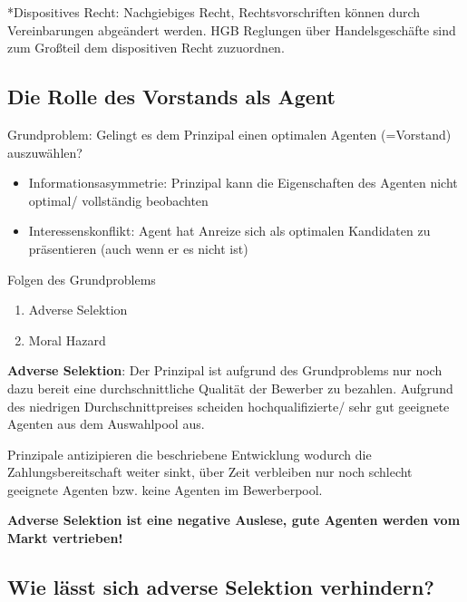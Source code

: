 \documentclass[
]{article}
\providecommand{\tightlist}{%
  \setlength{\itemsep}{0pt}\setlength{\parskip}{0pt}}
\begin{document}
*Dispositives Recht: Nachgiebiges Recht, Rechtsvorschriften können durch
Vereinbarungen abgeändert werden. HGB Reglungen über Handelsgeschäfte
sind zum Großteil dem dispositiven Recht zuzuordnen.

\hypertarget{die-rolle-des-vorstands-als-agent}{%
\subsection{Die Rolle des Vorstands als
Agent}\label{die-rolle-des-vorstands-als-agent}}

Grundproblem: Gelingt es dem Prinzipal einen optimalen Agenten
(=Vorstand) auszuwählen?

\begin{itemize}
\tightlist
\item
  Informationsasymmetrie: Prinzipal kann die Eigenschaften des Agenten
  nicht optimal/ vollständig beobachten
\item
  Interessenskonflikt: Agent hat Anreize sich als optimalen Kandidaten
  zu präsentieren (auch wenn er es nicht ist)
\end{itemize}

Folgen des Grundproblems

\begin{enumerate}
\def\labelenumi{\arabic{enumi}.}
\tightlist
\item
  Adverse Selektion
\item
  Moral Hazard
\end{enumerate}

\textbf{Adverse Selektion}: Der Prinzipal ist aufgrund des Grundproblems
nur noch dazu bereit eine durchschnittliche Qualität der Bewerber zu
bezahlen. Aufgrund des niedrigen Durchschnittpreises scheiden
hochqualifizierte/ sehr gut geeignete Agenten aus dem Auswahlpool aus.

Prinzipale antizipieren die beschriebene Entwicklung wodurch die
Zahlungsbereitschaft weiter sinkt, über Zeit verbleiben nur noch
schlecht geeignete Agenten bzw. keine Agenten im Bewerberpool.

\textbf{Adverse Selektion ist eine negative Auslese, gute Agenten werden
vom Markt vertrieben!}

\hypertarget{wie-luxe4sst-sich-adverse-selektion-verhindern}{%
\subsection{Wie lässt sich adverse Selektion
verhindern?}\label{wie-luxe4sst-sich-adverse-selektion-verhindern}}
\end{document}
